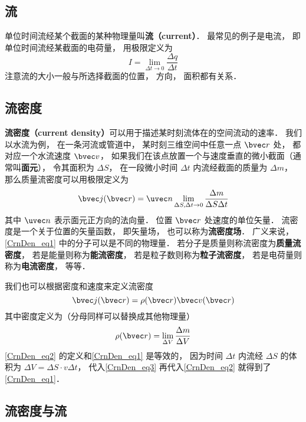 

\subsection{流}
单位时间流经某个截面的某种物理量叫\textbf{流（current）}． 最常见的例子是电流， 即单位时间流经某截面的电荷量， 用极限定义为
\begin{equation}
I = \lim_{\Delta t \to 0} \frac{\Delta q}{\Delta t}
\end{equation}
注意流的大小一般与所选择截面的位置， 方向， 面积都有关系．

\subsection{流密度}
\textbf{流密度（current density）}可以用于描述某时刻流体在的空间流动的速率． 我们以水流为例， 在一条河流或管道中， 某时刻三维空间中任意一点 $\bvec r$ 处， 都对应一个水流速度 $\bvec v$， 如果我们在该点放置一个与速度垂直的微小截面（通常叫\textbf{面元}）， 令其面积为 $\Delta S$， 在一段微小时间 $\Delta t$ 内流经截面的质量为 $\Delta m$， 那么质量流密度可以用极限定义为
\begin{equation}\label{CrnDen_eq1}
\bvec j(\bvec r) = \uvec n \lim_{\Delta S, \Delta t \to 0} \frac{\Delta m}{\Delta S \Delta t}
\end{equation}
其中 $\uvec n$ 表示面元正方向的法向量． 位置 $\bvec r$ 处速度的单位矢量． 流密度是一个关于位置的矢量函数， 即矢量场， 也可以称为\textbf{流密度场}． 广义来说， \autoref{CrnDen_eq1} 中的分子可以是不同的物理量． 若分子是质量则称流密度为\textbf{质量流密度}， 若是能量则称为\textbf{能流密度}， 若是粒子数则称为\textbf{粒子流密度}， 若是电荷量则称为\textbf{电流密度}， 等等． 

我们也可以根据密度和速度来定义流密度
\begin{equation}\label{CrnDen_eq2}
\bvec j(\bvec r) = \rho(\bvec r) \bvec v(\bvec r)
\end{equation}
其中密度定义为（分母同样可以替换成其他物理量）
\begin{equation}\label{CrnDen_eq3}
\rho(\bvec r) = \lim_{\Delta V} \frac{\Delta m}{\Delta V}
\end{equation}
\autoref{CrnDen_eq2} 的定义和\autoref{CrnDen_eq1} 是等效的， 因为时间 $\Delta t$ 内流经 $\Delta S$ 的体积为 $\Delta V = \Delta S \cdot v  \Delta t$， 代入\autoref{CrnDen_eq3} 再代入\autoref{CrnDen_eq2} 就得到了\autoref{CrnDen_eq1}．

\subsection{流密度与流}
